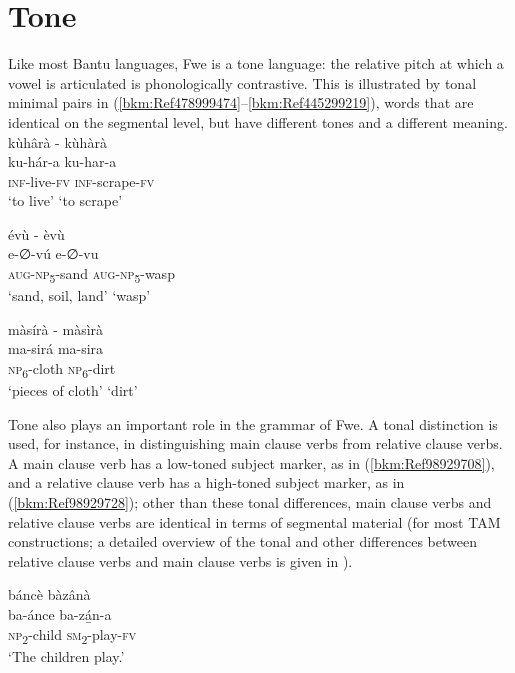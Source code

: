\chapter{Tone}
\label{bkm:Ref451507583}\hypertarget{Toc75352616}{}
Like most Bantu languages, Fwe is a tone language: the relative pitch at which a vowel is articu\-lated is phonologically contrastive. This is illustrated by tonal minimal pairs in (\ref{bkm:Ref478999474}--\ref{bkm:Ref445299219}), words that are identical on the segmental level, but have different tones and a different meaning.
\ea
\label{bkm:Ref478999474}
kùhârà \tab  - \tab kùhàrà\\
ku-hár-a \tab\tab    ku-har-a\\
\textsc{inf}-live-\textsc{fv}   \tab\tab \textsc{inf}-scrape-\textsc{fv}\\
\glt ‘to live’  \tab\tab  ‘to scrape’
\z

\ea
évù \tab    - \tab èvù\\
e-∅-vú  \tab\tab  e-∅-vu\\
\textsc{aug}-\textsc{np}\textsubscript{5}-sand \tab \textsc{aug}-\textsc{np}\textsubscript{5}-wasp\\
\glt ‘sand, soil, land’ \tab ‘wasp’
\z

\ea
\label{bkm:Ref445299219}
màsírà  \tab  - \tab màsìrà\\
ma-sirá  \tab\tab  ma-sira\\
\textsc{np}\textsubscript{6}-cloth   \tab\tab \textsc{np}\textsubscript{6}-dirt\\
\glt ‘pieces of cloth’ \tab ‘dirt’
\z

Tone also plays an important role in the grammar of Fwe. A tonal distinction is used, for in\-stance, in distinguishing main clause verbs from relative clause verbs. A main clause verb has a low-toned subject marker, as in (\ref{bkm:Ref98929708}), and a relative clause verb has a high-toned subject marker, as in (\ref{bkm:Ref98929728}); other than these tonal differences, main clause verbs and relative clause verbs are identical in terms of segmen\-tal material (for most TAM constructions; a detailed overview of the tonal and other differ\-ences between relative clause verbs and main clause verbs is given in ).

\ea
\label{bkm:Ref98929708}
báncè bàzânà\\
\gll ba-ánce  ba-zá̲n-a\\
\textsc{np}\textsubscript{2}-child  \textsc{sm}\textsubscript{2}-play-\textsc{fv}\\
\glt ‘The children play.’
\z

